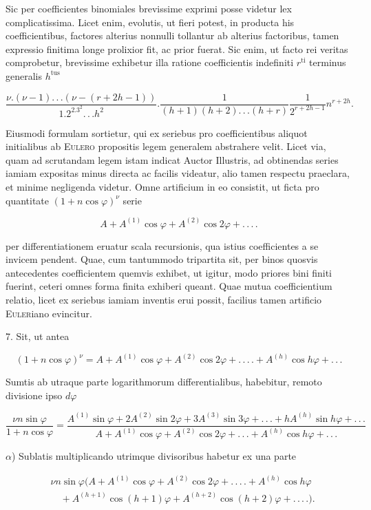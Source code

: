 \par\noindent{}%
\hspace*{\parindent}Sic per coefficientes binomiales brevissime exprimi posse videtur lex complicatissima.
Licet enim, evolutis, ut fieri potest, in producta his coefficientibus, factores alterius
nonnulli tollantur ab alterius factoribus, tamen expressio finitima longe prolixior fit,
ac prior fuerat. Sic enim, ut facto rei veritas comprobetur, brevissime exhibetur illa
ratione coefficientis indefiniti $r^{\text{ti}}$ terminus generalis $h^{\text{tus}}$

\[
\frac{\nu.(\nu-1).\,.\,.(\nu-(r+2h-1))}{1.2^2.3^2.\,.\,. h^2} . \frac{1}{(h+1)(h+2).\,.\,.(h+r)}\frac{1}{2^{r+2h-1}}n^{r+2h}.
\]

Eiusmodi formulam sortietur, qui ex seriebus pro coefficientibus aliquot initialibus ab
\textsc{Eulero} propositis legem generalem abstrahere velit. Licet via, quam ad scrutandam
legem istam indicat Auctor Illustris, ad obtinendas series iamiam expositas minus
directa ac facilis videatur, alio tamen respectu praeclara, et minime negligenda videtur.
Omne artificium in eo consistit, ut ficta pro quantitate $(1+n\cos\varphi)^{\nu}$ serie

\[
A+A^{(1)}\cos\varphi+A^{(2)}\cos2\varphi+.\,.\,.\,.
\]

\noindent per differentiationem eruatur scala recursionis, qua istius coefficientes a se invicem
pendent. Quae, cum tantummodo tripartita sit, per binos quosvis antecedentes
coefficientem quemvis exhibet, ut igitur, modo priores bini finiti fuerint, ceteri omnes
forma finita exhiberi queant. Quae mutua coefficientium relatio, licet ex seriebus
iamiam inventis erui possit, facilius tamen artificio \textsc{Euler}iano evincitur.

7. Sit, ut antea

\[
(1+n\cos\varphi)^{\nu}=A+A^{(1)}\cos\varphi+A^{(2)}\cos2\varphi+.\,.\,.\,.+A^{(h)}\cos h\varphi+.\,.\,.
\]

\noindent Sumtis ab utraque parte logarithmorum differentialibus, habebitur, remoto divisione
ipso $d\varphi$

\[
\frac{\nu n\sin\varphi}{1+n\cos\varphi}=\frac{A^{(1)}\sin\varphi+2A^{(2)}\sin2\varphi+3A^{(3)}\sin3\varphi+.\,.\,.+hA^{(h)}\sin h\varphi+.\,.\,.}{A+A^{(1)}\cos\varphi+A^{(2)}\cos2\varphi+.\,.\,.+A^{(h)}\cos h\varphi+.\,.\,.}
\]

$\alpha$) Sublatis multiplicando utrimque divisoribus habetur ex una parte

\[
\begin{aligned}
&\nu n\sin\varphi\bigl(A+A^{(1)}\cos\varphi+A^{(2)}\cos2\varphi+.\,.\,.\,.+A^{(h)}\cos h\varphi\\&\quad+A^{(h+1)}\cos(h+1)\varphi+A^{(h+2)}\cos(h+2)\varphi+.\,.\,.\,.\bigr).
\end{aligned}
\]
